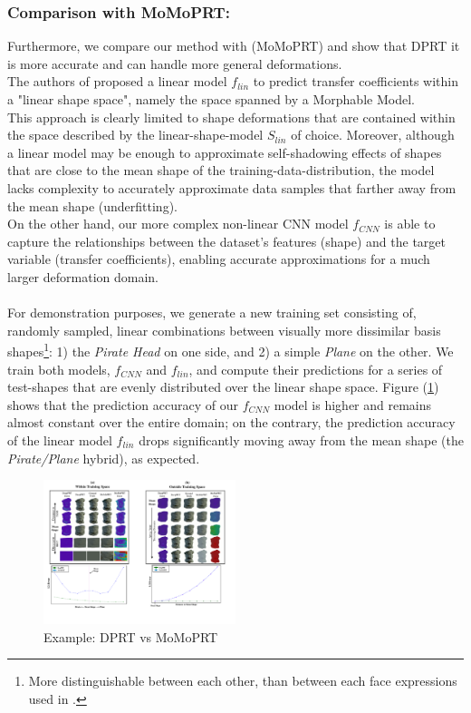 \subsubsection*{\textbf{Comparison with MoMoPRT:}}
Furthermore, we compare our method with \cite{MoMoPRT} (MoMoPRT) and show that DPRT it is more accurate and can handle more general deformations. \\
The authors of \cite{MoMoPRT} proposed a linear model $f_{lin}$ to predict transfer coefficients within a "linear shape space", namely the space spanned by a Morphable Model.\\
This approach is clearly limited to shape deformations that are contained within the space described by the linear-shape-model $S_{lin}$ of choice. Moreover, although a linear model may be enough to approximate self-shadowing effects of shapes that are close to the mean shape of the training-data-distribution, the model lacks complexity to accurately approximate data samples that farther away from the mean shape (underfitting).  
\\
On the other hand, our more complex non-linear CNN model $f_{CNN}$ is able to capture the relationships between the dataset's features (shape) and the target variable (transfer coefficients), enabling accurate approximations for a much larger deformation domain.\\
\\
For demonstration purposes, we generate a new training set consisting of, randomly sampled, linear combinations between visually more dissimilar basis shapes\footnote{More distinguishable between each other, than between each face expressions used in \cite{MoMo}.}: 1) the \textit{Pirate Head } on one side, and 2)  a simple \textit{Plane} on the other. We train both models, $f_{CNN}$ and $f_{lin}$, and compute their predictions for a series of test-shapes that are evenly distributed over the linear shape space. Figure (\ref{Fig:DPRT vs MoMoPRT A}) shows that the prediction accuracy of our $f_{CNN}$ model is higher and remains almost constant over the entire domain; on the contrary, the prediction accuracy of the linear model $f_{lin}$ drops significantly moving away from the mean shape (the \textit{Pirate/Plane} hybrid), as expected. 
\begin{figure}[H]
  \centering
    \includegraphics[width=0.5\textwidth]{Figures/DPRT_vs_MoMoPRT_a.pdf}
     \caption{Example: DPRT vs MoMoPRT}
     \label{Fig:DPRT vs MoMoPRT A}
\end{figure}
